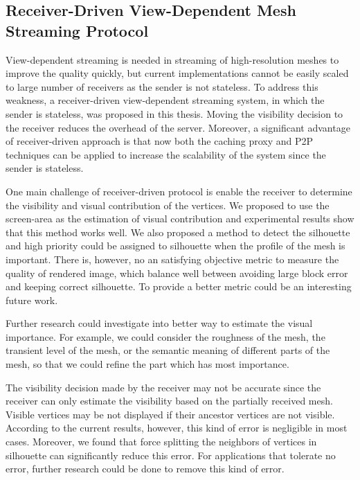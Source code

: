 \documentclass[11pt, a4paper]{report}
\begin{document}
\subsection{Receiver-Driven View-Dependent Mesh Streaming Protocol}
View-dependent streaming is needed in streaming of high-resolution meshes
to improve the quality quickly, but current implementations cannot be easily scaled
to large number of receivers as the sender is not stateless. 
To address this weakness, a receiver-driven view-dependent streaming system,
in which the sender is stateless, was proposed in this thesis. 
Moving the visibility decision to the receiver reduces the overhead of the server. 
Moreover, a significant advantage of receiver-driven approach is that
now both the caching proxy and P2P techniques can be applied to increase the scalability of the system
since the sender is stateless. 

One main challenge of receiver-driven protocol is enable the receiver
to determine the visibility and visual contribution of the vertices.
We proposed to use the screen-area as the estimation of visual contribution and 
experimental results show that this method works well. 
We also proposed a method
to detect the silhouette and high priority could be assigned to silhouette when the
profile of the mesh is important. 
There is, however, no an satisfying objective metric to measure the quality
of rendered image, which balance well between avoiding large block error and 
keeping correct silhouette. To provide a better metric could be an interesting 
future work. 

Further research could investigate into better way to estimate the visual importance.
For example, we could consider the roughness of the mesh, the transient level of the mesh,
or the semantic meaning of different parts of the mesh, so that we could refine 
the part which has most importance.

The visibility decision made by the receiver may not be accurate 
since the receiver can only estimate the visibility based on
the partially received mesh. 
Visible vertices may be not displayed if their ancestor vertices are not visible. 
According to the current results, however, this kind of error is negligible in most cases. 
Moreover, we found that force splitting the neighbors of vertices in silhouette can significantly reduce this error.
For applications that tolerate no error, 
further research could be done to remove this kind of error. 
\end{document}
